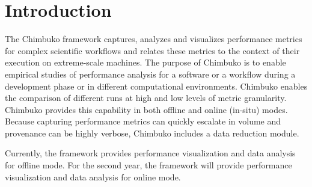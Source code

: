 \section{Introduction}
The Chimbuko framework captures, analyzes and visualizes performance metrics for complex scientific workflows and relates these metrics to the context of their execution on extreme-scale machines. The purpose of Chimbuko is to enable empirical studies of performance analysis for a software or a workflow during a development phase or in different computational environments. Chimbuko enables the comparison of different runs at high and low levels of metric granularity. Chimbuko provides this capability in both offline and online (in-situ) modes. Because capturing performance metrics can quickly escalate in volume and provenance can be highly verbose, Chimbuko includes a data reduction module. 

Currently, the framework provides performance visualization and data analysis for offline mode.  For the second year, the framework will provide performance visualization and data analysis for online mode.		
